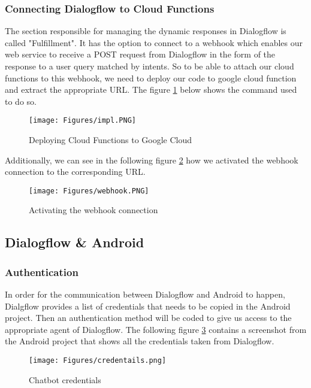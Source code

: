 \subsubsection{Connecting Dialogflow to Cloud Functions}
The section responsible for managing the dynamic responses in Dialogflow is called "Fulfillment". It has the option to connect to a webhook which enables our web service to receive a POST request from Dialogflow in the form of the response to a user query matched by intents. So to be able to attach our cloud functions to this webhook, we need to deploy our code to google cloud function and extract the appropriate URL. The figure \ref{fig:cloud deploy} below shows the command used to do so.
\newline
\begin{figure}[H]
\centering
\texttt{[image: Figures/impl.PNG]}
\caption{Deploying Cloud Functions to Google Cloud}
\label{fig:cloud deploy}
\end{figure}
Additionally, we can see in the following figure \ref{fig:url on fulf} how we activated the webhook connection to the corresponding URL.
\newline
\begin{figure}[H]
\centering
\texttt{[image: Figures/webhook.PNG]}
\caption{Activating the webhook connection}
\label{fig:url on fulf}
\end{figure}
\subsection{Dialogflow \& Android}
\subsubsection{Authentication}
In order for the communication between Dialogflow and Android to happen, Dialgflow provides a list of credentials that needs to be copied in the Android project. Then an authentication method will be coded to give us access to the appropriate agent of Dialogflow. The following figure \ref{fig:connecting crened} contains a screenshot from the Android project that shows all the credentials taken from Dialogflow.    
\begin{figure}[H]
\centering
\texttt{[image: Figures/credentails.png]}
\caption{Chatbot credentials}
\label{fig:connecting crened}
\end{figure}


